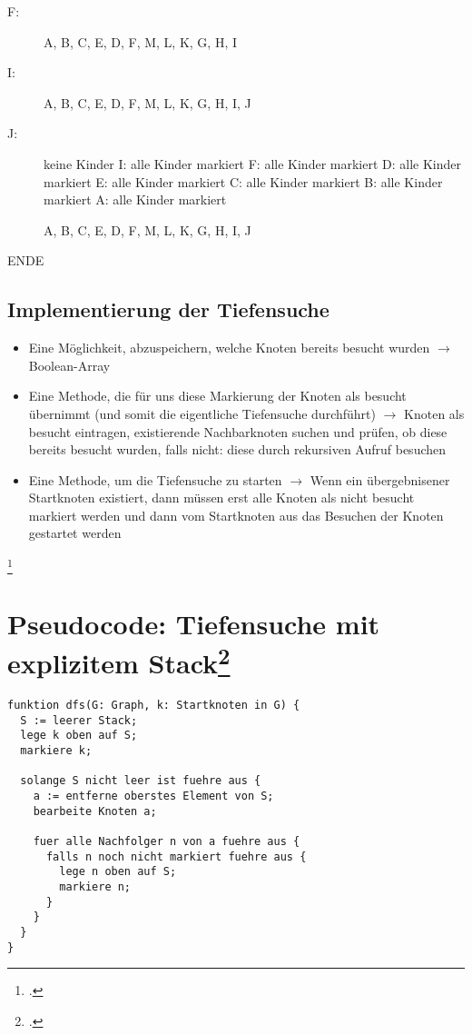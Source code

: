 \documentclass{lehramt-informatik}
\begin{document}
\begin{description}
\item[F:]
A, B, C, E, D, F, M, L, K, G, H, I

\item[I:]
A, B, C, E, D, F, M, L, K, G, H, I, J

\item[J:] keine Kinder
I: alle Kinder markiert
F: alle Kinder markiert
D: alle Kinder markiert
E: alle Kinder markiert
C: alle Kinder markiert
B: alle Kinder markiert
A: alle Kinder markiert

A, B, C, E, D, F, M, L, K, G, H, I, J

\end{description}

ENDE

\subsection{Implementierung der Tiefensuche}

\begin{itemize}
\item Eine Möglichkeit, abzuspeichern, welche Knoten bereits besucht
wurden $\rightarrow$ Boolean-Array

\item Eine Methode, die für uns diese Markierung der Knoten als besucht
übernimmt (und somit die eigentliche Tiefensuche durchführt)
$\rightarrow$  Knoten als besucht eintragen, existierende Nachbarknoten
suchen und prüfen, ob diese bereits besucht wurden, falls nicht: diese
durch rekursiven Aufruf besuchen

\item Eine Methode, um die Tiefensuche zu starten $\rightarrow$  Wenn
ein übergebnisener Startknoten existiert, dann müssen erst alle Knoten
als nicht besucht markiert werden und dann vom Startknoten aus das
Besuchen der Knoten gestartet werden
\end{itemize}
\footcite[Seite 45 (PDF 45)]{aud:fs:6}

\section{Pseudocode: Tiefensuche mit explizitem Stack\footcite[Seite 51 (PDF 45)]{aud:fs:6}}

\begin{verbatim}
funktion dfs(G: Graph, k: Startknoten in G) {
  S := leerer Stack;
  lege k oben auf S;
  markiere k;

  solange S nicht leer ist fuehre aus {
    a := entferne oberstes Element von S;
    bearbeite Knoten a;

    fuer alle Nachfolger n von a fuehre aus {
      falls n noch nicht markiert fuehre aus {
        lege n oben auf S;
        markiere n;
      }
    }
  }
}
\end{verbatim}
\end{document}
